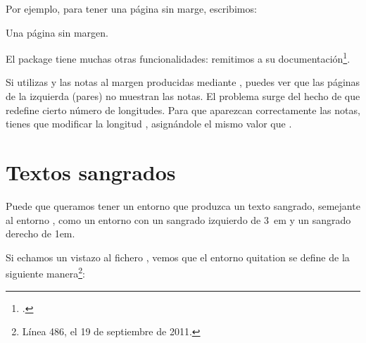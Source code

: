 Por ejemplo, para tener una página sin marge, escribimos:

\begin{latexcode}
Una página sin margen.
\newpage
\restoregeometry
\end{latexcode}

El package  tiene muchas otras funcionalidades: remitimos a su documentación\footcite{geometry}.

\begin{attention}
Si utilizas  y las notas al margen producidas mediante , puedes ver que las páginas de la izquierda (pares) no muestran las notas. El problema surge del hecho de que  redefine cierto número de longitudes. Para que aparezcan correctamente las notas, tienes que modificar la longitud , asignándole el mismo valor que .

\begin{latexcode}
\setlength{\marginparwidth}{\leftmargin}
\end{latexcode}
\end{attention}

\section{Textos sangrados}

Puede que queramos tener un entorno que produzca un texto sangrado, semejante al entorno , como un entorno  con un sangrado izquierdo de 3~em y un sangrado derecho de 1em.

Si echamos un vistazo al fichero , vemos que el entorno quitation se define de la siguiente manera\footnote{Línea 486, el 19 de septiembre de 2011.}:

\begin{latexcode}
\newenvironment{quotation}
               {\list{}{\listparindent 1.5em %
                        \itemindent    \listparindent
                        \rightmargin   \leftmargin
                        \parsep        \z@ \@plus\p@}%
                \item\relax}
               {\endlist}
\end{latexcode}

